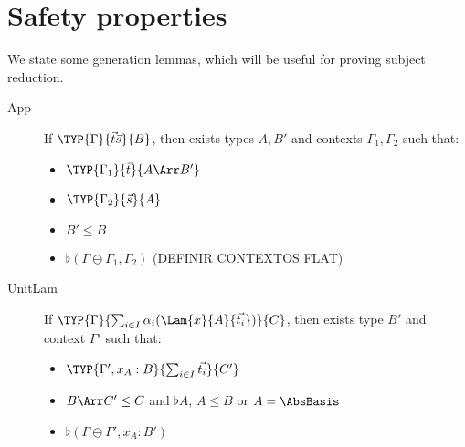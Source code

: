 \section{Safety properties}

\begin{lemma}
    We state some generation lemmas, which will be useful for proving subject reduction.

\begin{description}
    \item[App] If $\TYP{\Gamma}{\vec{t}\vec{s}}{B}$, then exists types $A, B'$ and contexts $\Gamma_1,\Gamma_2$ such that:
    \begin{itemize}
        \item $\TYP{\Gamma_1}{\vec{t}}{A\Arr B'}$ 
        \item $\TYP{\Gamma_2}{\vec{s}}{A}$
        \item $B'\leq B$
        \item $\flat(\Gamma\ominus\Gamma_1 , \Gamma_2)$ {\color{red}(DEFINIR CONTEXTOS FLAT)}
    \end{itemize}

    \item[UnitLam] If $\TYP{\Gamma}{\sum_{i\in I}\alpha_i (\Lam{x}{A}{\vec{t_i}})}{C}$, then exists type $B'$ and context $\Gamma'$ such that:
    \begin{itemize}
        \item $\TYP{\Gamma', x_A:B}{\sum_{i\in I}\vec{t_i}}{C'}$ 
        \item $B\Arr C'\leq C$ and {\color{red} $\flat A$, $A\leq B$ or $A =\AbsBasis$}
        \item $\flat(\Gamma\ominus\Gamma', x_A:B')$ 
    \end{itemize}

\end{description}    
\end{lemma}

